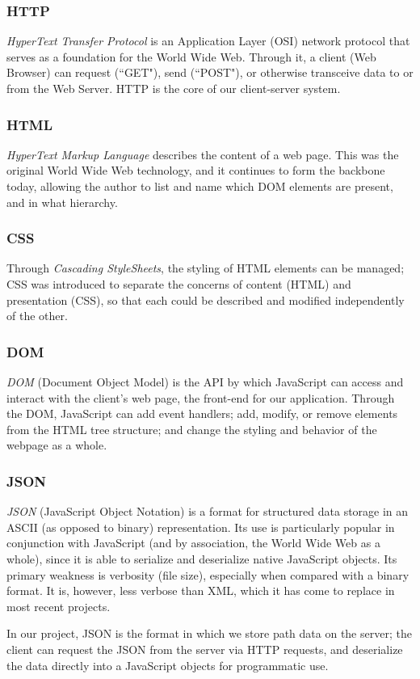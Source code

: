 \subsubsection{HTTP}
\emph{HyperText Transfer Protocol} is an Application Layer (OSI) network protocol that serves as a foundation for the World Wide Web. Through it, a client (Web Browser) can request (``GET"), send (``POST"), or otherwise transceive data to or from the Web Server. HTTP is the core of our client-server system.\cite{http}
\subsubsection{HTML}
\emph{HyperText Markup Language} describes the content of a web page. This was the original World Wide Web technology, and it continues to form the backbone today, allowing the author to list and name which DOM elements are present, and in what hierarchy.\cite{html}
\subsubsection{CSS}
Through \emph{Cascading StyleSheets}, the styling of HTML elements can be managed; CSS was introduced to separate the concerns of content (HTML) and presentation (CSS), so that each could be described and modified independently of the other.\cite{css}
\subsubsection{DOM}
\emph{DOM} (Document Object Model) is the API by which JavaScript can access and interact with the client's web page, the front-end for our application. Through the DOM, JavaScript can add event handlers; add, modify, or remove elements from the HTML tree structure; and change the styling and behavior of the webpage as a whole.\cite{dom}
\subsubsection{JSON}
\emph{JSON} (JavaScript Object Notation) is a format for structured data storage in an ASCII (as opposed to binary) representation.\cite{json} Its use is particularly popular in conjunction with JavaScript (and by association, the World Wide Web as a whole), since it is able to serialize and deserialize native JavaScript objects. Its primary weakness is verbosity (file size), especially when compared with a binary format. It is, however, less verbose than XML, which it has come to replace in most recent projects.\par
In our project, JSON is the format in which we store path data on the server; the client can request the JSON from the server via HTTP requests, and deserialize the data directly into a JavaScript objects for programmatic use.
